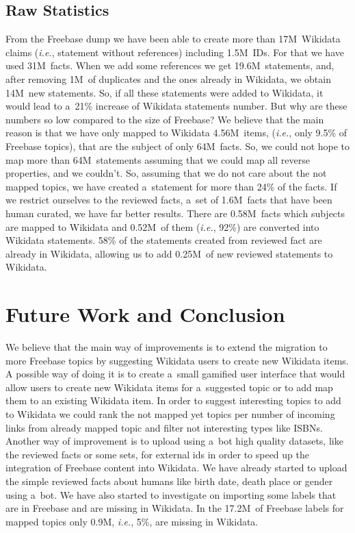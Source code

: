 \documentclass{sig-alternate}
\begin{document}
\subsection{Raw Statistics}

From the Freebase dump we have been able to create more than 17M~Wikidata claims
(\emph{i.e.}, statement without references) including 1.5M~IDs.
For that we have used 31M~facts.
When we add some references we get 19.6M~statements, and, after removing 1M~of duplicates
and the ones already in Wikidata, we obtain 14M~new statements.
So, if all these statements were added to Wikidata,
it would lead to a~21\% increase of Wikidata statements number.
But why are these numbers so low compared to the size of Freebase?
We believe that the main reason is that we have only mapped to Wikidata 4.56M~items, (\emph{i.e.},
only 9.5\% of Freebase topics), that are the subject of only 64M~facts.
So, we could not hope to map more than 64M~statements
assuming that we could map all reverse properties, and we couldn't.
So, assuming that we do not care about the not mapped topics,
we have created a~statement for more than 24\% of the facts.
If we restrict ourselves to the reviewed facts, a~set of 1.6M~facts
that have been human curated, we have far better results.
There are 0.58M~facts which subjects are mapped to Wikidata and 0.52M~of them
(\emph{i.e.}, 92\%) are converted into Wikidata statements.
58\% of the statements created from reviewed fact are already in Wikidata,
allowing us to add 0.25M~of new reviewed statements to Wikidata.

\section{Future Work and Conclusion}\label{sec:future-work-and-conclusion}

We believe that the main way of improvements is to extend the migration to more Freebase topics
by suggesting Wikidata users to create new Wikidata items.
A possible way of doing it is to create a~small gamified user interface that would allow users
to create new Wikidata items for a~suggested topic or to add map them to an existing Wikidata item.
In order to suggest interesting topics to add to Wikidata
we could rank the not mapped yet topics per number of incoming links from already mapped topic
and filter not interesting types like ISBNs.
Another way of improvement is to upload using a~bot high quality datasets,
like the reviewed facts or some sets,
for external ids in order to speed up the integration of Freebase content into Wikidata.
We have already started to upload the simple reviewed facts about humans
like birth date, death place or gender using a~bot.
We have also started to investigate on importing some labels
that are in Freebase and are missing in Wikidata.
In the 17.2M~of Freebase labels for mapped topics only 0.9M, \emph{i.e.},
5\%, are missing in Wikidata.
\end{document}
